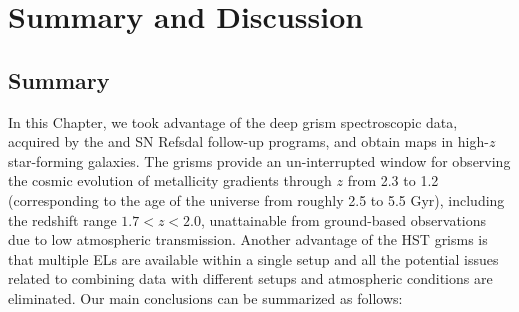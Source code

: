 \section{Summary and Discussion}\label{sect:conclu}

\subsection{Summary}

In this Chapter, we took advantage of the deep \hst grism spectroscopic data, acquired by the
\glass and SN Refsdal follow-up programs, and obtain \gpm maps in high-$z$ star-forming
galaxies. The \hst grisms provide an un-interrupted window for observing the cosmic evolution
of metallicity gradients through $z$ from 2.3 to 1.2 (corresponding to the age of the
universe from roughly 2.5 to 5.5 Gyr), including the redshift range $1.7<z<2.0$, unattainable
from ground-based observations due to low atmospheric transmission. Another advantage of the
HST grisms is that multiple ELs are available within a single setup and all the potential
issues related to combining data with different setups and atmospheric conditions are
eliminated. Our main conclusions can be summarized as follows:
